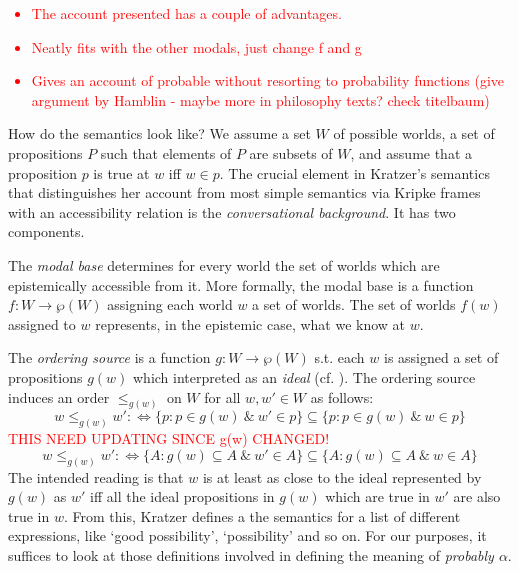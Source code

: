 \documentclass{article}
\theoremstyle{definition}
\newcommand\todo[1]{\textcolor{red}{#1}}
\begin{document}
\todo{\begin{itemize}[nosep]
  \item The account presented has a couple of advantages.
\item Neatly fits with the other modals, just change f and g
\item Gives an account of probable without resorting to probability functions (give argument by Hamblin - maybe more in philosophy texts? check titelbaum)
\end{itemize}
}
How do the semantics look like?
We assume a set $W$ of possible worlds, a set of propositions $P$ such that elements of $P$ are subsets of $W$, and assume that a proposition $p$ is true at $w$ iff $w \in p$.
The crucial element in Kratzer's semantics that distinguishes her account from most simple semantics via Kripke frames with an accessibility relation is the \emph{conversational background}.
It has two components.

The \emph{modal base} determines for every world the set of worlds which are epistemically accessible from it.
More formally, the modal base is a function $f: W \rightarrow \wp(W)$ assigning each world $w$ a set of worlds.
The set of worlds $f(w)$ assigned to $w$ represents, in the epistemic case, what we know at $w$.

The \emph{ordering source} is a function $g: W \rightarrow \wp(W)$ s.t. each $w$ is assigned a set of propositions $g(w)$ which interpreted as an \emph{ideal} (cf. \cite{lewis81_order_seman_premis_seman_count}). The ordering source induces an order $\leq_{g(w)}$ on $W$ for all $w,w' \in W$ as follows:
\begin{equation}
    \label{eq:porder}
w \leq_{g(w)} w' :\iff \{p: p\in g(w) ~\&~ w' \in p\} \subseteq \{p: p\in  g(w) ~\&~ w \in p\}
\end{equation}
\todo{THIS NEED UPDATING SINCE g(w) CHANGED!}
\begin{equation}
    \label{eq:porder}
w \leq_{g(w)} w' :\iff \{A: g(w) \subseteq A ~\&~ w' \in A\} \subseteq \{A: g(w) \subseteq A ~\&~ w \in A\}
\end{equation}
The intended reading is that $w$ is at least as close to the ideal represented by $g(w)$ as $w'$ iff all the ideal propositions in $g(w)$ which are true in $w'$ are also true in $w$.
From this, Kratzer defines a the semantics for a list of different expressions, like `good possibility', `possibility' and so on.
For our purposes, it suffices to look at those definitions involved in defining the meaning of \emph{probably $\alpha$}.
\end{document}
